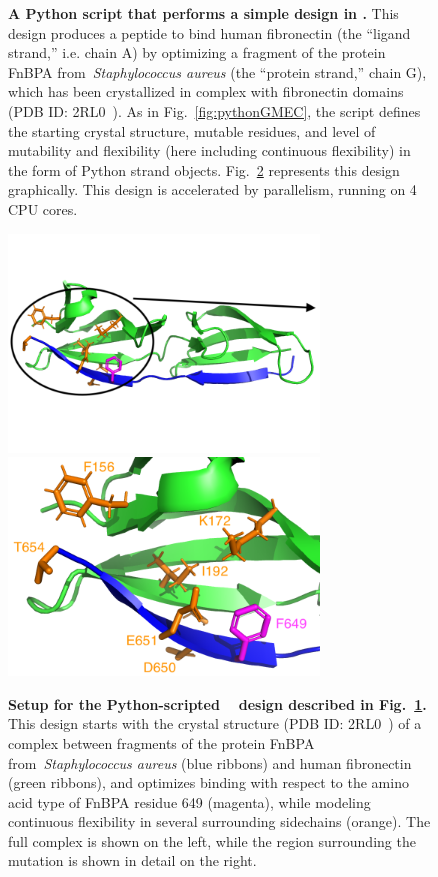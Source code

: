 \begin{figure}
\vspace{-0.7in}
\resizebox{\textwidth}{!}
{
	
}
\caption{\textbf{A Python script that performs a simple \bbks design in .}  This design produces a peptide to bind human fibronectin (the ``ligand strand,'' i.e. chain A) by optimizing a fragment of the protein FnBPA from~\textit{Staphylococcus aureus} (the ``protein strand,'' chain G), which has been crystallized in complex with fibronectin domains (PDB ID: 2RL0~\cite{2RL0}).  As in Fig.~\ref{fig:pythonGMEC}, the script defines the starting crystal structure, mutable residues, and level of mutability and flexibility (here including continuous flexibility) in the form of Python strand objects.   Fig.~\ref{fig:pythonBBKSpic} represents this design graphically.  This design is accelerated by parallelism, running on 4 CPU cores.    }
\label{fig:pythonBBKS}
\end{figure}

\begin{figure}
\includegraphics[width=3.25in]{figures/python_bbks_full.png}\includegraphics[width=3.25in]{figures/python_bbks_zoom.png}
\caption{\textbf{Setup for the Python-scripted \bbks~\cite{BBK*} design described in Fig.~\ref{fig:pythonBBKS}.}  This design starts with the crystal structure (PDB ID: 2RL0~\cite{2RL0}) of a complex between fragments of the protein FnBPA from~\textit{Staphylococcus aureus} (blue ribbons) and human fibronectin (green ribbons), and optimizes binding with respect to the amino acid type of FnBPA residue 649 (magenta), while modeling continuous flexibility in several surrounding sidechains (orange).  The full complex is shown on the left, while the region surrounding the mutation is shown in detail on the right.  }
\label{fig:pythonBBKSpic}
\end{figure}